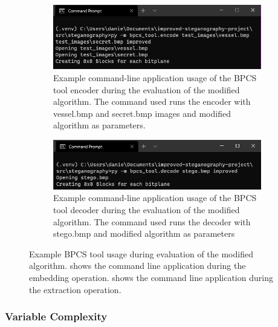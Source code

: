 \documentclass{l4proj}
\begin{document}
\begin{appendices}
\begin{figure}
    \centering
    \begin{subfigure}[b]{0.75\textwidth}
        \includegraphics[width=\textwidth]{images/improved_bpcs_encode_terminal.png}
        \caption{Example command-line application usage of the BPCS tool encoder during the evaluation of the modified algorithm. The command used runs the encoder with vessel.bmp and secret.bmp images and modified algorithm as parameters.}
        \label{fig:improved_bpcs_encode_terminal}
    \end{subfigure}
    \begin{subfigure}[b]{0.75\textwidth}
        \includegraphics[width=\textwidth]{images/improved_bpcs_terminal_decode.png}
        \caption{Example command-line application usage of the BPCS tool decoder during the evaluation of the modified algorithm. The command used runs the decoder with stego.bmp and modified algorithm as parameters}
        \label{fig:improved_bpcs_decoder_terminal}
    \end{subfigure}
    \caption{Example BPCS tool usage during evaluation of the modified algorithm.  shows the command line application during the embedding operation.  shows the command line application during the extraction operation.}
\end{figure}

\subsubsection{Variable Complexity}


\end{appendices}
\end{document}
